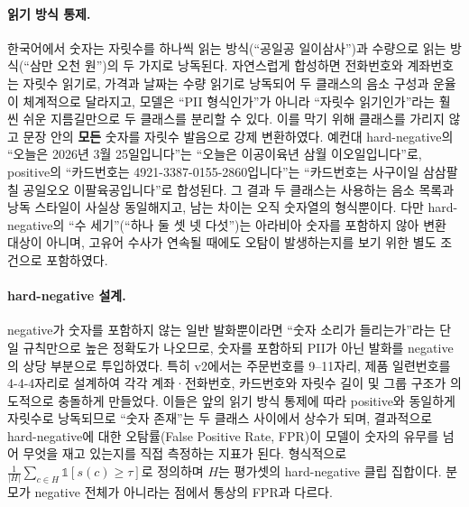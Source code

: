 \documentclass[10pt,twocolumn]{article}
\renewcommand{\emph}[1]{\textbf{#1}}
\begin{document}
\paragraph{읽기 방식 통제.}
한국어에서 숫자는 자릿수를 하나씩 읽는 방식(``공일공 일이삼사'')과 수량으로 읽는
방식(``삼만 오천 원'')의 두 가지로 낭독된다. 자연스럽게 합성하면 전화번호와 계좌번호는 자릿수
읽기로, 가격과 날짜는 수량 읽기로 낭독되어 두 클래스의 음소 구성과 운율이 체계적으로
달라지고, 모델은 ``PII 형식인가''가 아니라 ``자릿수 읽기인가''라는 훨씬 쉬운 지름길만으로
두 클래스를 분리할 수 있다. 이를 막기 위해 클래스를 가리지 않고 문장 안의 \emph{모든} 숫자를
자릿수 발음으로 강제 변환하였다. 예컨대 hard-negative의 ``오늘은 2026년 3월 25일입니다''는
``오늘은 이공이육년 삼월 이오일입니다''로, positive의 ``카드번호는
4921-3387-0155-2860입니다''는 ``카드번호는 사구이일 삼삼팔칠 공일오오 이팔육공입니다''로
합성된다. 그 결과 두 클래스는 사용하는 음소 목록과 낭독 스타일이 사실상 동일해지고, 남는
차이는 오직 숫자열의 형식뿐이다. 다만 hard-negative의 ``수 세기''(``하나 둘 셋 넷 다섯'')는
아라비아 숫자를 포함하지 않아 변환 대상이 아니며, 고유어 수사가 연속될 때에도 오탐이
발생하는지를 보기 위한 별도 조건으로 포함하였다.

\paragraph{hard-negative 설계.}
negative가 숫자를 포함하지 않는 일반 발화뿐이라면 ``숫자 소리가 들리는가''라는 단일 규칙만으로
높은 정확도가 나오므로, 숫자를 포함하되 PII가 아닌 발화를 negative의 상당 부분으로 투입하였다.
특히 v2에서는 주문번호를 9--11자리, 제품 일련번호를 4-4-4자리로 설계하여 각각 계좌·전화번호,
카드번호와 자릿수 길이 및 그룹 구조가 의도적으로 충돌하게 만들었다. 이들은 앞의 읽기 방식
통제에 따라 positive와 동일하게 자릿수로 낭독되므로 ``숫자 존재''는 두 클래스 사이에서 상수가
되며, 결과적으로 hard-negative에 대한 오탐률(False Positive Rate, FPR)이 모델이 숫자의 유무를
넘어 무엇을 재고 있는지를 직접 측정하는 지표가 된다. 형식적으로
$\frac{1}{|H|}\sum_{c\in H}\mathbb{1}[s(c)\ge\tau]$로 정의하며 $H$는 평가셋의 hard-negative
클립 집합이다. 분모가 negative 전체가 아니라는 점에서 통상의 FPR과 다르다.
\end{document}
